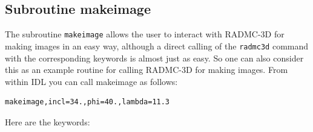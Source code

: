 \documentclass{report}
\newenvironment{asciibox}%
  {\begin{list}{}{%
    \setlength{\topsep}{0.5em}%
    \setlength{\parskip}{0em}%
    \setlength{\parsep}{0em}%
    \setlength{\itemsep}{0em}%
    \setlength{\rightmargin}{0em}%
    \setlength{\leftmargin}{3.0em}%
    \setlength{\labelsep}{1em}%
    \setlength{\labelwidth}{2em}%
  }\normalfont\footnotesize\item}
  {\end{list}}
\begin{document}
\subsection{Subroutine makeimage}
\label{sec-idl-makeimage}
%
The subroutine {\small\tt makeimage} allows the user to interact with RADMC-3D for
making images in an easy way, although a direct calling of the {\small\tt radmc3d}
command with the corresponding keywords is almost just as easy. So one can
also consider this as an example routine for calling RADMC-3D for making
images. From within IDL you can call makeimage as follows:
\begin{asciibox}\begin{verbatim}
makeimage,incl=34.,phi=40.,lambda=11.3
\end{verbatim}\end{asciibox}
Here are the keywords:
\end{document}
